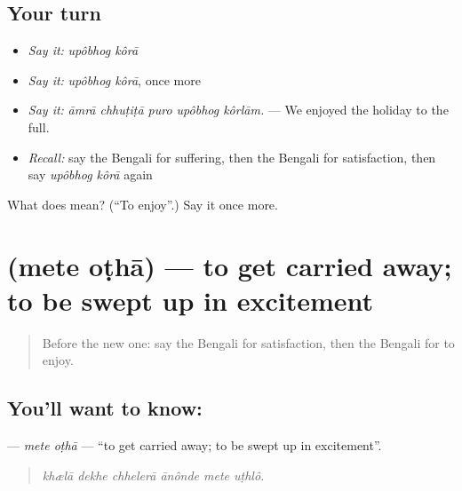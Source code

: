 \subsection*{Your turn}
\begin{itemize}
\raggedright
  \item \emph{Say it:} \emph{upôbhog kôrā}
  \item \emph{Say it:} \emph{upôbhog kôrā}, once more
  \item \emph{Say it:} \emph{āmrā chhuṭiṭā puro upôbhog kôrlām.} — We enjoyed the holiday to the full.
  \item \emph{Recall:} say the Bengali for suffering, then the Bengali for satisfaction, then say \emph{upôbhog kôrā} again
\end{itemize}

\begin{tcolorbox}[breakable,colback=teal!4,colframe=teal!35!black,title={Before you move on}]
What does   mean? (\textquotedblleft{}To enjoy\textquotedblright{}.) Say it once more.
\end{tcolorbox}
\section[\texorpdfstring{\bn{মেতে} \bn{ওঠা} (mete oṭhā)}{মেতে ওঠা (mete oṭhā)}]{  (mete oṭhā) — to get carried away; to be swept up in excitement}

\label{lesson:BN-C439-mete-otha}



\begin{quote}
Before the new one: say the Bengali for satisfaction, then the Bengali for to enjoy.
\end{quote}

\subsection*{You'll want to know:  }
\textbf{ } — \emph{mete oṭhā} — \textquotedblleft{}to get carried away; to be swept up in excitement\textquotedblright{}.

\begin{quote}
     
\end{quote}

\begin{quote}
\emph{khælā dekhe chhelerā ānônde mete uṭhlô.}
\end{quote}

